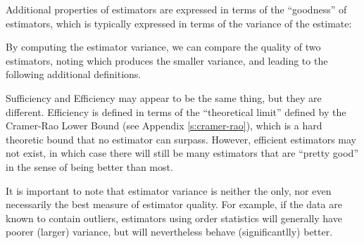 Additional properties of estimators are expressed in terms of the
``goodness'' of estimators, which is typically expressed in terms of
the variance of the estimate:



By computing the estimator variance, we can compare the quality of two estimators, noting which
produces the smaller variance, and leading to the following additional 
definitions.



Sufficiency and Efficiency may appear to be the same thing, but they
are different.  Efficiency is defined in terms of the ``theoretical
limit'' defined by the Cramer-Rao Lower Bound (see Appendix
\ref{s:cramer-rao}), which is a hard theoretic bound that no estimator
can surpass.  However, efficient estimators may not exist, in which
case there will still be many estimators that are ``pretty good'' in
the sense of being better than most.

It is important to note that estimator variance is neither the only, nor even necessarily the best
measure of estimator quality.  For example, if the data are known to contain outliers, estimators
using order statistics will generally have poorer (larger) variance, but will nevertheless 
behave (significantlly) better.

